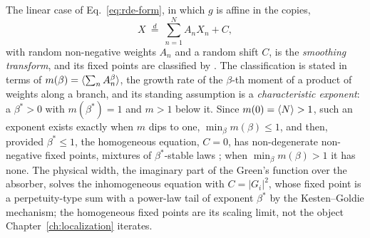 The linear case of Eq.~\eqref{eq:rde-form}, in which $g$ is affine in the
copies,
\begin{equation}
  X\ \stackrel{d}{=}\ \sum_{n=1}^{N}A_{n}X_{n}+C,
  \label{eq:rde-smoothing}
\end{equation}
with random non-negative weights $A_{n}$ and a random shift $C$, is the
\emph{smoothing transform}, and its fixed points are classified by
\citet{alsmeyer2012}. The classification is stated in terms of
$m(\beta)=\langle \sum_{n}A_{n}^{\beta} \rangle$, the growth rate of the $\beta$-th
moment of a product of weights along a branch, and its standing assumption
is a \emph{characteristic exponent}: a $\beta^{*}>0$ with
$m(\beta^{*})=1$ and $m>1$ below it. Since $m(0)=\langle N \rangle>1$, such an
exponent exists exactly when $m$ dips to one, $\min_{\beta}m(\beta)\le1$,
and then, provided $\beta^{*}\le1$, the homogeneous equation, $C=0$, has
non-degenerate non-negative fixed points, mixtures of $\beta^{*}$-stable
laws \citep{durrett1983,alsmeyer2012}; when $\min_{\beta}m(\beta)>1$ it has
none. The physical width, the imaginary part of the Green's function over
the absorber, solves the inhomogeneous equation with $C=|G_{i}|^{2}$, whose
fixed point is a perpetuity-type sum with a power-law tail of exponent
$\beta^{*}$ by the Kesten--Goldie mechanism; the homogeneous fixed points
are its scaling limit, not the object Chapter~\ref{ch:localization}
iterates.


